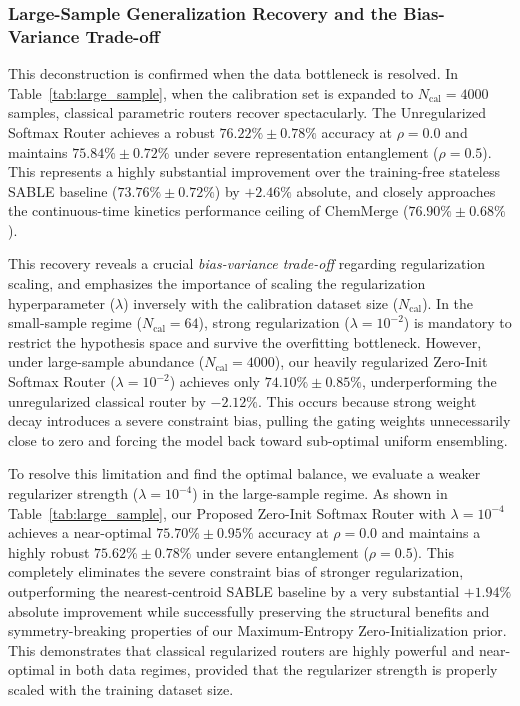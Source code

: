 \subsubsection{Large-Sample Generalization Recovery and the Bias-Variance Trade-off}
This deconstruction is confirmed when the data bottleneck is resolved. In Table~\ref{tab:large_sample}, when the calibration set is expanded to $N_{\text{cal}} = 4000$ samples, classical parametric routers recover spectacularly. The Unregularized Softmax Router achieves a robust $76.22\% \pm 0.78\%$ accuracy at $\rho = 0.0$ and maintains $75.84\% \pm 0.72\%$ under severe representation entanglement ($\rho = 0.5$). This represents a highly substantial improvement over the training-free stateless SABLE baseline ($73.76\% \pm 0.72\%$) by $+2.46\%$ absolute, and closely approaches the continuous-time kinetics performance ceiling of ChemMerge ($76.90\% \pm 0.68\%$).

This recovery reveals a crucial \emph{bias-variance trade-off} regarding regularization scaling, and emphasizes the importance of scaling the regularization hyperparameter ($\lambda$) inversely with the calibration dataset size ($N_{\text{cal}}$). In the small-sample regime ($N_{\text{cal}}=64$), strong regularization ($\lambda = 10^{-2}$) is mandatory to restrict the hypothesis space and survive the overfitting bottleneck. However, under large-sample abundance ($N_{\text{cal}}=4000$), our heavily regularized Zero-Init Softmax Router ($\lambda=10^{-2}$) achieves only $74.10\% \pm 0.85\%$, underperforming the unregularized classical router by $-2.12\%$. This occurs because strong weight decay introduces a severe constraint bias, pulling the gating weights unnecessarily close to zero and forcing the model back toward sub-optimal uniform ensembling. 

To resolve this limitation and find the optimal balance, we evaluate a weaker regularizer strength ($\lambda=10^{-4}$) in the large-sample regime. As shown in Table~\ref{tab:large_sample}, our Proposed Zero-Init Softmax Router with $\lambda=10^{-4}$ achieves a near-optimal $75.70\% \pm 0.95\%$ accuracy at $\rho=0.0$ and maintains a highly robust $75.62\% \pm 0.78\%$ under severe entanglement ($\rho=0.5$). This completely eliminates the severe constraint bias of stronger regularization, outperforming the nearest-centroid SABLE baseline by a very substantial $+1.94\%$ absolute improvement while successfully preserving the structural benefits and symmetry-breaking properties of our Maximum-Entropy Zero-Initialization prior. This demonstrates that classical regularized routers are highly powerful and near-optimal in both data regimes, provided that the regularizer strength is properly scaled with the training dataset size.

